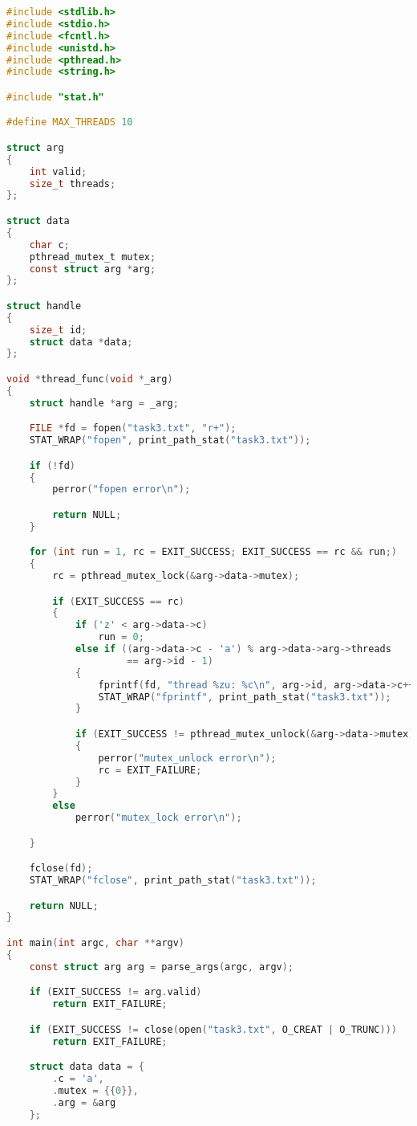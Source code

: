 \begin{lstlisting}[language=c, caption={Вторая программа 2 (многопоточный вариант)}]
#include <stdlib.h>
#include <stdio.h>
#include <fcntl.h>
#include <unistd.h>
#include <pthread.h>
#include <string.h>

#include "stat.h"

#define MAX_THREADS 10

struct arg
{
    int valid;
    size_t threads;
};

struct data
{
    char c;
    pthread_mutex_t mutex;
    const struct arg *arg;
};

struct handle
{
    size_t id;
    struct data *data;
};

void *thread_func(void *_arg)
{
    struct handle *arg = _arg;

    FILE *fd = fopen("task3.txt", "r+");
    STAT_WRAP("fopen", print_path_stat("task3.txt"));

    if (!fd)
    {
        perror("fopen error\n");

        return NULL;
    }

    for (int run = 1, rc = EXIT_SUCCESS; EXIT_SUCCESS == rc && run;)
    {
        rc = pthread_mutex_lock(&arg->data->mutex);

        if (EXIT_SUCCESS == rc)
        {
            if ('z' < arg->data->c)
                run = 0;
            else if ((arg->data->c - 'a') % arg->data->arg->threads
                     == arg->id - 1)
            {
                fprintf(fd, "thread %zu: %c\n", arg->id, arg->data->c++);
                STAT_WRAP("fprintf", print_path_stat("task3.txt"));
            }

            if (EXIT_SUCCESS != pthread_mutex_unlock(&arg->data->mutex))
            {
                perror("mutex_unlock error\n");
                rc = EXIT_FAILURE;
            }
        }
        else
            perror("mutex_lock error\n");

    }

    fclose(fd);
    STAT_WRAP("fclose", print_path_stat("task3.txt"));

    return NULL;
}

int main(int argc, char **argv)
{
    const struct arg arg = parse_args(argc, argv);

    if (EXIT_SUCCESS != arg.valid)
        return EXIT_FAILURE;

    if (EXIT_SUCCESS != close(open("task3.txt", O_CREAT | O_TRUNC)))
        return EXIT_FAILURE;

    struct data data = {
        .c = 'a',
        .mutex = {{0}},
        .arg = &arg
    };


\end{lstlisting}
